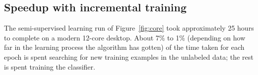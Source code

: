 \documentclass[conference]{IEEEtran}
\newcommand{\todo}[1]{\textcolor{red}{[[#1]]}}
\begin{document}
\begin{comment}
\subsection{Accuracy as a function of labeling effort}
\label{sec:effort}

In Figure~\ref{fig:effort} we show quantitatively how well the supervised vs semi-supervised methods perform given equal amounts of hand-labeled training tracks.

A set of \todo{x} unlabeled tracks was given to the semi-supervised method.  To produce this plot, we adopted a minor variation on Algorithm~\ref{alg:ssl}: when a track is inducted, only the incorrectly classified frames of that track are added to the new training set.  This helps reduce the memory requirements of the method, which are otherwise problematic.  This experiment does not produce strong performance at just a few hand-labeled seed tracks, as was shown in Figure~\ref{fig:quantity}, likely because the seed tracks here were chosen randomly rather than picked specifically to be good examples.

We found it was possible to get strong performance with very few seed tracks by increasing the amount of unlabeled data provided, but that doing so often resulted in running out of memory.  This highlights a key challenge in making use of tracking-based semi-supervised learning: an online learning algorithm will probably be required for larger quantities of unlabeled data.

\begin{figure}
  \centering
  \texttt{[image: 11-05-30\_rss\_static\_img/effort.pdf]}
  \caption{High accuracy can be achieved with substantially less human labeling effort when using tracking-based semi-supervised learning than with the comparable fully-supervised method.}
  \label{fig:effort}
\end{figure}

\end{comment}


\subsection{Speedup with incremental training}
\label{sec:rr}

The semi-supervised learning run of Figure~\ref{fig:core} took approximately 25 hours to complete on a modern 12-core desktop.  About 7\% to 1\% (depending on how far in the learning process the algorithm has gotten) of the time taken for each epoch is spent searching for new training examples in the unlabeled data; the rest is spent training the classifier.
\end{document}
